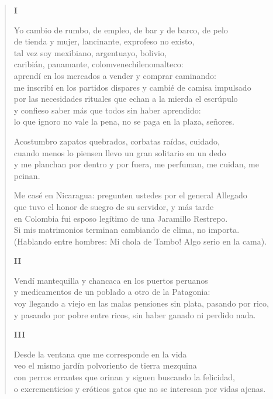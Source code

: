 \documentclass[12pt]{article}
\begin{document}
\clearpage
{}
\begin{verse}

{\bfseries\scshape {I}}

Yo cambio de rumbo, de empleo, de bar y de barco, de pelo\\
de tienda y mujer, lancinante, exprofeso no existo,\\
tal vez soy mexibiano, argentuayo, bolivio,\\
caribián, panamante, colomvenechilenomalteco:\\
aprendí en los mercados a vender y comprar caminando:\\
me inscribí en los partidos dispares y cambié de camisa impulsado\\
por las necesidades rituales que echan a la mierda el escrúpulo\\
y confieso saber más que todos sin haber aprendido:\\
lo que ignoro no vale la pena, no se paga en la plaza, señores.  

Acostumbro zapatos quebrados, corbatas raídas, cuidado,\\
cuando menos lo piensen llevo un gran solitario en un dedo\\
y me planchan por dentro y por fuera, me perfuman, me cuidan, me\\
peinan.  

Me casé en Nicaragua: pregunten ustedes por el general Allegado\\
que tuvo el honor de suegro de su servidor, y más tarde\\
en Colombia fui esposo legítimo de una Jaramillo Restrepo.\\
Si mis matrimonios terminan cambiando de clima, no importa.\\
(Hablando entre hombres: Mi chola de Tambo! Algo serio en la cama).  

{\bfseries\scshape {II}}

Vendí mantequilla y chancaca en los puertos peruanos\\
y medicamentos de un poblado a otro de la Patagonia:\\
voy llegando a viejo en las malas pensiones sin plata, pasando por rico,\\
y pasando por pobre entre ricos, sin haber ganado ni perdido nada.  

{\bfseries\scshape {III}}

Desde la ventana que me corresponde en la vida\\
veo el mismo jardín polvoriento de tierra mezquina\\
con perros errantes que orinan y siguen buscando la felicidad,\\
o excrementicios y eróticos gatos que no se interesan por vidas ajenas.  


\end{verse}
\end{document}
